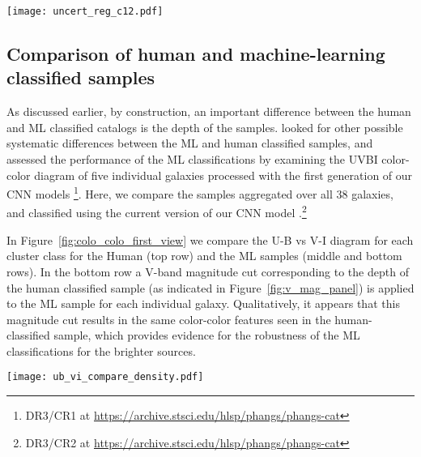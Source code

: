 \documentclass[linenumbers]{aastex63}
\begin{document}
\begin{figure*} 
\texttt{[image: uncert\_reg\_c12.pdf]}
 \caption{Mean color uncertainties for the NUV-B vs V-I (top row) and U-B vs V-I (bottom row) diagrams. We present class 1+2 clusters for ML (left two panels) and human classifications (right two panels) separately. The maps show the mean uncertainty in each bin, and only bins with at least 5 clusters are displayed. }
 \label{fig:color_color_uncert}
\end{figure*}








\subsection{Comparison of human and machine-learning classified samples}\label{ssect:cc_compare}
As discussed earlier, by construction, an important difference between the human and ML classified catalogs is the depth of the samples.
\citet{whitmore_star_2021} looked for other possible systematic differences between the ML and human classified samples, and assessed the performance of the ML classifications by examining the UVBI color-color diagram of five individual galaxies processed with the first generation of our CNN models \citep{wei_deep_2020}\footnote{DR3/CR1 at \url{https://archive.stsci.edu/hlsp/phangs/phangs-cat}}.
Here, we compare the samples aggregated over all 38 galaxies, and classified using the current version of our CNN model \citep{hannon_star_2023}.\footnote{DR3/CR2 at \url{https://archive.stsci.edu/hlsp/phangs/phangs-cat}} 

In Figure~\ref{fig:colo_colo_first_view} we compare the U-B vs V-I diagram for each cluster class for the Human (top row) and the ML samples (middle and bottom rows).
In the bottom row a V-band magnitude cut corresponding to the depth of the human classified sample (as indicated in Figure~\ref{fig:v_mag_panel}) is applied to the ML sample for each individual galaxy. Qualitatively, it appears that this magnitude cut results in the same color-color features seen in the human-classified sample, which provides evidence for the robustness of the ML classifications for the brighter sources. 
\begin{figure*} 
\texttt{[image: ub\_vi\_compare\_density.pdf]}
 \caption{Color-color diagrams for the Human cluster sample (top row) and the ML cluster sample (middle and bottom rows). In the middle row we show all ML classified clusters, whereas the bottom row only shows ML classified clusters up to the same V-band magnitude for each target as detected for the human sample. The individual V-band cuts are estimated with the maximal detected magnitude as presented in Figure~\ref{fig:v_mag_panel}. Cluster classes 1, 2, 1+2 and class 3 compact associations are shown individually in each column from left to right, respectively. Clusters are represented by black dots and in crowded regions by a Gaussian-smoothed heat map indicating the relative density.}
 \label{fig:colo_colo_first_view}
\end{figure*}
\end{document}
